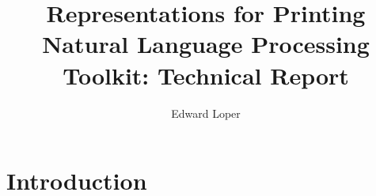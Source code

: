 \documentclass[11pt]{article}
\begin{document}
\title{Representations for Printing\\
\Large Natural Language Processing Toolkit: Technical Report}
\author{Edward Loper}
\maketitle

\section{Introduction}
\end{document}
